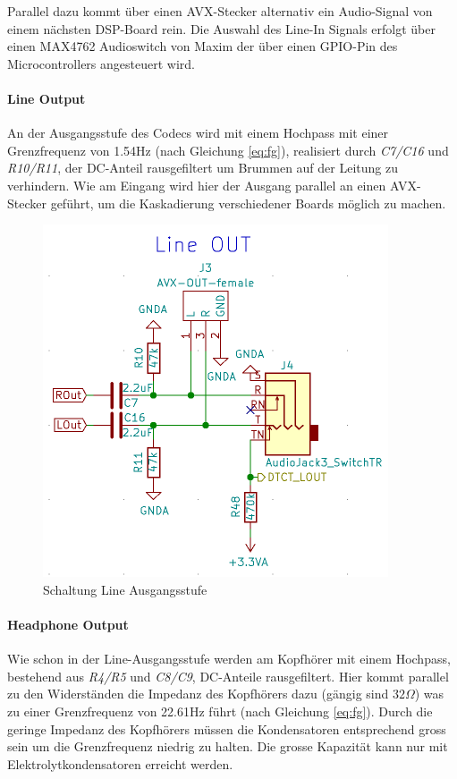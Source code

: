 Parallel dazu kommt über einen AVX-Stecker alternativ ein Audio-Signal von einem nächsten DSP-Board rein. Die Auswahl des Line-In Signals erfolgt über einen MAX4762 \cite{max4762} Audioswitch von Maxim der über einen GPIO-Pin des Microcontrollers angesteuert wird. 

\paragraph{Line Output}
\label{par:LineOUT}
An der Ausgangsstufe des Codecs wird mit einem Hochpass mit einer Grenzfrequenz von 1.54Hz (nach Gleichung \ref{eq:fg}), realisiert durch \textit{C7/C16} und \textit{R10/R11}, der DC-Anteil rausgefiltert um Brummen auf der Leitung zu verhindern.
Wie am Eingang wird hier der Ausgang parallel an einen AVX-Stecker geführt, um die Kaskadierung verschiedener Boards möglich zu machen.


\begin{figure} [H]
\begin{center}
 \includegraphics[scale=0.5]{../graphics/Schema_LineOUT.png}
\caption{Schaltung Line Ausgangsstufe}
\label{fig:Schema_LineOUT}
\end{center}
\end{figure}


\paragraph{Headphone Output}
\label{par:HPOUT}
Wie schon in der Line-Ausgangsstufe werden am Kopfhörer mit einem Hochpass, bestehend aus \textit{R4/R5} und \textit{C8/C9}, DC-Anteile rausgefiltert. Hier kommt parallel zu den Widerständen die Impedanz des Kopfhörers dazu (gängig sind $32\Omega$) was zu einer Grenzfrequenz von 22.61Hz führt (nach Gleichung \ref{eq:fg}). Durch die geringe Impedanz des Kopfhörers müssen die Kondensatoren entsprechend gross sein um die Grenzfrequenz niedrig zu halten. Die grosse Kapazität kann nur mit Elektrolytkondensatoren erreicht werden.

